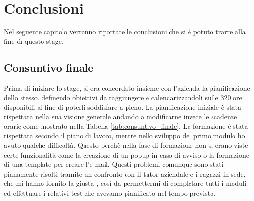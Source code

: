 
\hypertarget{(chap:capitolo8)}{}
\chapter{Conclusioni}
Nel seguente capitolo verranno riportate le conclusioni che si è potuto trarre alla fine di questo stage.
\section{Consuntivo finale}
Prima di iniziare lo stage, si era concordato insieme con l'azienda la pianificazione dello stesso, definendo obiettivi da raggiungere e calendarizzandoli sulle 320 ore disponibili al fine di poterli soddisfare a pieno. La pianificazione iniziale è stata rispettata nella sua visione generale andando a modificarne invece le scadenze orarie come mostrato nella Tabella \ref{tab:consuntivo_finale}. La formazione è stata rispettata secondo il piano di lavoro, mentre nello sviluppo del primo modulo  ho avuto qualche difficoltà. Questo perchè nella fase di formazione non si erano viste certe funzionalità come la creazione di un popup in caso di avviso o la formazione di una template per creare l'e-mail. Questi problemi comunque sono stati pianamente risolti tramite un confronto con il tutor aziendale e i ragazzi in sede, che mi hanno fornito la giusta , così da permettermi di completare tutti i moduli ed effettuare i relativi test che avevamo pianificato nel tempo previsto.

